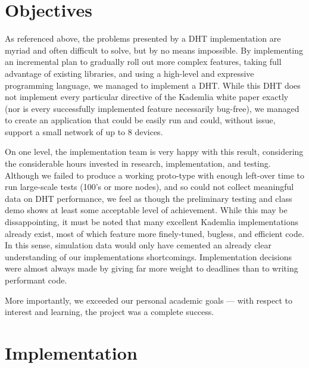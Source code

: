 \documentclass[12pt]{report}
\begin{document}
    \section{Objectives}
    As referenced above, the problems presented by a DHT implementation are
    myriad and often difficult to solve, but by no means impossible.  By implementing
    an incremental plan to gradually roll out more complex features, taking
    full advantage of existing libraries, and using a high-level and expressive
    programming language, we managed to implement a DHT.  While this DHT does
    not implement every particular directive of the Kademlia white paper
    exactly (nor is every successfully implemented feature necessarily
    bug-free), we managed to create an application that could be easily run and
    could, without issue, support a small network of up to 8 devices.

    On one level, the implementation team is very happy with this result,
    considering the considerable hours invested in research, implementation,
    and testing.  Although we failed to produce a working proto-type with
    enough left-over time to run large-scale tests (100's or more nodes), and
    so could not collect meaningful data on DHT performance, we feel as though
    the preliminary testing and class demo shows at least some acceptable level
    of achievement.  While this may be dissappointing, it must be noted that
    many excellent Kademlia implementations already exist, most of which
    feature more finely-tuned, bugless, and efficient code.  In this sense,
    simulation data would only have cemented an already clear understanding of
    our implementations shortcomings.  Implementation decisions were almost
    always made by giving far more weight to deadlines than to writing
    performant code.
    
    More importantly, we exceeded our personal academic goals
    --- with respect to interest and learning, the project was a complete
    success.  
    
    \section{Implementation}
\end{document}
